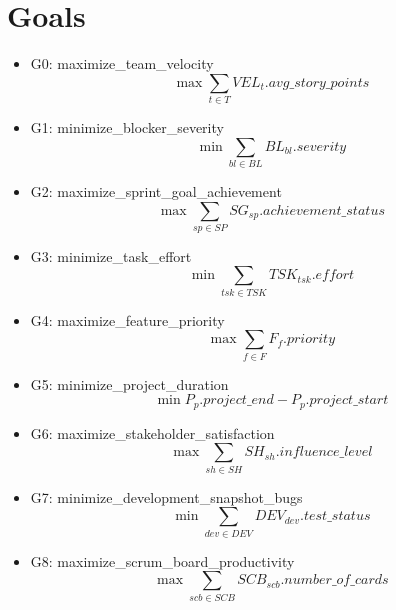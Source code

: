 \documentclass{article}
\begin{document}
\section{Goals}
\begin{itemize}
    \item G0: maximize\_team\_velocity
        \begin{equation*}
            \max \sum_{t \in T} VEL_{t}.avg\_story\_points
        \end{equation*}
    \item G1: minimize\_blocker\_severity
        \begin{equation*}
            \min \sum_{bl \in BL} BL_{bl}.severity
        \end{equation*}
    \item G2: maximize\_sprint\_goal\_achievement
        \begin{equation*}
            \max \sum_{sp \in SP} SG_{sp}.achievement\_status
        \end{equation*}
    \item G3: minimize\_task\_effort
        \begin{equation*}
            \min \sum_{tsk \in TSK} TSK_{tsk}.effort
        \end{equation*}
    \item G4: maximize\_feature\_priority
        \begin{equation*}
            \max \sum_{f \in F} F_{f}.priority
        \end{equation*}
    \item G5: minimize\_project\_duration
        \begin{equation*}
            \min P_{p}.project\_end - P_{p}.project\_start
        \end{equation*}
    \item G6: maximize\_stakeholder\_satisfaction
        \begin{equation*}
            \max \sum_{sh \in SH} SH_{sh}.influence\_level
        \end{equation*}
    \item G7: minimize\_development\_snapshot\_bugs
        \begin{equation*}
            \min \sum_{dev \in DEV} DEV_{dev}.test\_status
        \end{equation*}
    \item G8: maximize\_scrum\_board\_productivity
        \begin{equation*}
            \max \sum_{scb \in SCB} SCB_{scb}.number\_of\_cards

\end{equation*}
\end{itemize}
\end{document}
